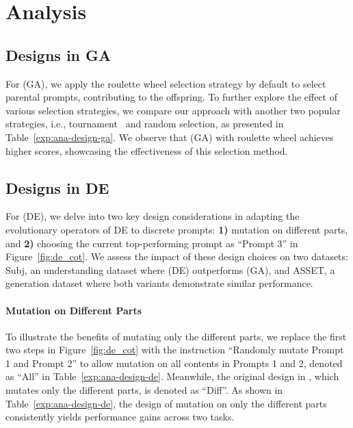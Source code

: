 \section{Analysis}

\subsection{Designs in GA}

For \modelname (GA), we apply the roulette wheel selection strategy by default to select parental prompts, contributing to the offspring. 
To further explore the effect of various selection strategies, we compare our approach with another two popular strategies, i.e., tournament~\citep{enwiki:1160627612} and random selection, as presented in Table~\ref{exp:ana-design-ga}. We observe that \modelname (GA) with roulette wheel achieves higher scores, showcasing the effectiveness of this selection method.

\subsection{Designs in DE}
For \modelname (DE), we delve into two key design considerations in adapting the evolutionary operators of DE to discrete prompts: \textbf{1)} mutation on different parts, and \textbf{2)} choosing the current top-performing prompt as ``Prompt 3'' in Figure~\ref{fig:de_cot}. We assess the impact of these design choices on two datasets: Subj, an understanding dataset where \modelname (DE) outperforms \modelname (GA), and ASSET, a generation dataset where both variants demonstrate similar performance.

\paragraph{Mutation on Different Parts}
To illustrate the benefits of mutating only the different parts, we replace the first two steps in Figure~\ref{fig:de_cot} with the instruction ``Randomly mutate Prompt 1 and Prompt 2'' to allow mutation on all contents in Prompts 1 and 2, denoted as ``All'' in Table~\ref{exp:ana-design-de}. Meanwhile, the original design in \modelname, which mutates only the different parts, is denoted as ``Diff''. 
As shown in Table~\ref{exp:ana-design-de}, the design of mutation on only the different parts consistently yields performance gains across two tasks.
